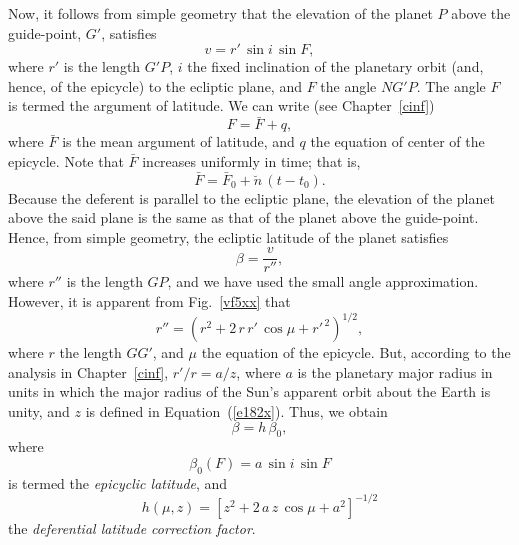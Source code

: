 Now, it follows from simple geometry that the elevation of the planet $P$ above  the
guide-point, $G'$, satisfies 
\begin{equation}
v= r'\,\sin i\,\sin F,
\end{equation}
 where $r'$ is the length $G'P$, $i$  the fixed inclination of the
planetary orbit (and, hence, of the epicycle) to the ecliptic plane, and $F$  the angle $NG'P$. The
angle $F$ is termed the argument of latitude. We can write (see Chapter~\ref{cinf})
\begin{equation}
F = \bar{F} + q,
\end{equation}
where $\bar{F}$ is the mean argument of latitude, and $q$ the equation of center of the epicycle. Note that $\bar{F}$
increases uniformly  in time; that is, 
\begin{equation}
\bar{F}  = \bar{F}_0 + \breve{n}\,(t-t_0).
\end{equation}
 Because the deferent is parallel to the ecliptic
plane, the elevation of the planet above the said plane is
the same as that of the planet above the guide-point. Hence, from simple geometry, the ecliptic latitude of the planet satisfies
\begin{equation}
\beta = \frac{v}{r''},
\end{equation}
where $r''$ is the length $GP$, and
we have used the small angle approximation. However, it is apparent from Fig.~\ref{vf5xx} that
\begin{equation}
r'' = (r^2 + 2\,r\,r'\,\cos\mu+ r'^{\,2})^{1/2},
\end{equation}
where $r$ the length $GG'$, and $\mu$ the
equation of the epicycle. But, according to the analysis in Chapter~\ref{cinf}, $r'/r = a/z$, where $a$ is the planetary
major radius in units in which the major radius of the Sun's apparent orbit
about the Earth is unity, and $z$ is defined in Equation~(\ref{e182x}).
Thus, we obtain
\begin{equation}
\beta =h\,\beta_0,
\end{equation}
where
\begin{equation}
\beta_0(F) = a\,\sin i\,\sin F
\end{equation}
is termed the {\em epicyclic latitude},
and
\begin{equation}
h(\mu,z) = \left[z^2 + 2\,a\,z\,\cos\mu+ a^2\right]^{-1/2}
\end{equation}
the {\em deferential latitude correction factor}.

